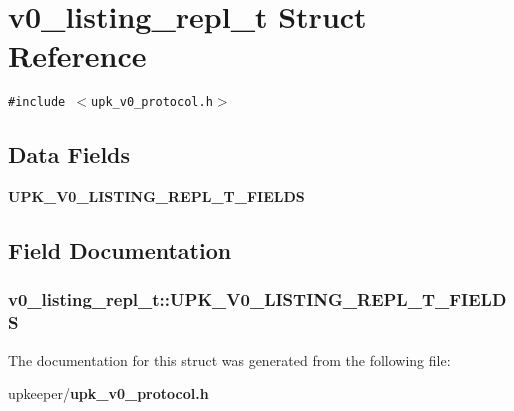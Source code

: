 \section{v0\_\-listing\_\-repl\_\-t Struct Reference}
\label{structv0__listing__repl__t}
{\tt \#include $<$upk\_\-v0\_\-protocol.h$>$}

\subsection*{Data Fields}
\begin{CompactItemize}
\item 
\bf{UPK\_\-V0\_\-LISTING\_\-REPL\_\-T\_\-FIELDS}
\end{CompactItemize}


\subsection{Field Documentation}
\subsubsection{\setlength{\rightskip}{0pt plus 5cm}\bf{v0\_\-listing\_\-repl\_\-t::UPK\_\-V0\_\-LISTING\_\-REPL\_\-T\_\-FIELDS}}\label{structv0__listing__repl__t_d4269ab00ae4bbc5e8b390f97fbc912b}




The documentation for this struct was generated from the following file:\begin{CompactItemize}
\item 
upkeeper/\bf{upk\_\-v0\_\-protocol.h}\end{CompactItemize}
